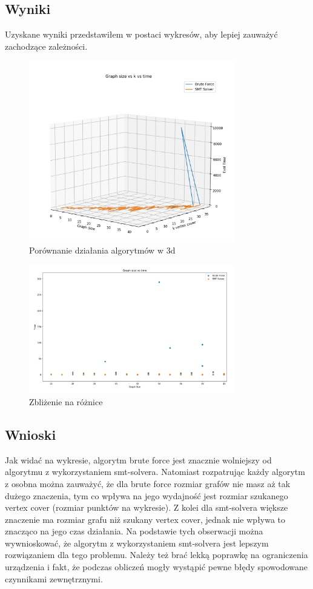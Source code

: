 \documentclass{article}
\begin{document}
\subsection{Wyniki}
Uzyskane wyniki przedstawiłem w postaci wykresów, aby lepiej zauważyć zachodzące zależności.
\begin{figure}[h!]
    \centering
    \includegraphics[width=0.8\textwidth]{time_eval.png}
    \caption{Porównanie działania algorytmów w 3d}
    \label{fig:resultsH1}
\end{figure}

\begin{figure}[h!]
    \centering
    \includegraphics[width=0.8\textwidth]{closeup.png}
    \caption{Zbliżenie na różnice}
    \label{fig:resultsH2}
\end{figure}

\subsection{Wnioski}
Jak widać na wykresie, algorytm brute force jest znacznie wolniejszy od algorytmu z wykorzystaniem smt-solvera.
Natomiast rozpatrując każdy algorytm z osobna można zauważyć, że dla brute force rozmiar grafów nie masz aż tak dużego znaczenia, 
tym co wpływa na jego wydajność jest rozmiar szukanego vertex cover (rozmiar punktów na wykresie). 
Z kolei dla smt-solvera większe znaczenie ma rozmiar grafu niż szukany vertex cover, jednak nie wpływa to znacząco na jego czas działania.
Na podstawie tych obserwacji można wywnioskować, że algorytm z wykorzystaniem smt-solvera jest lepszym rozwiązaniem dla tego problemu.
Należy też brać lekką poprawkę na ograniczenia urządzenia i fakt, że podczas obliczeń mogły wystąpić pewne błędy spowodowane czynnikami zewnętrznymi.
\end{document}
